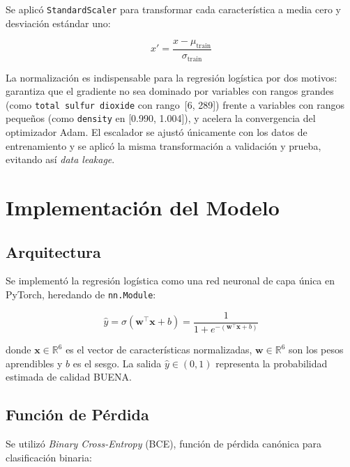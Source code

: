 \documentclass[conference]{IEEEtran}
\begin{document}
Se aplic\'{o} \texttt{StandardScaler} para transformar cada caracter\'{i}stica a media cero y desviaci\'{o}n est\'{a}ndar uno:

\begin{equation}
  x' = \frac{x - \mu_{\text{train}}}{\sigma_{\text{train}}}
\end{equation}

La normalizaci\'{o}n es indispensable para la regresi\'{o}n log\'{i}stica por dos motivos: garantiza que el gradiente no sea dominado por variables con rangos grandes (como \texttt{total sulfur dioxide} con rango~[6, 289]) frente a variables con rangos peque\~{n}os (como \texttt{density} en [0.990, 1.004]), y acelera la convergencia del optimizador Adam. El escalador se ajust\'{o} \'{u}nicamente con los datos de entrenamiento y se aplic\'{o} la misma transformaci\'{o}n a validaci\'{o}n y prueba, evitando as\'{i} \textit{data leakage}.

\section{Implementaci\'{o}n del Modelo}

\subsection{Arquitectura}

Se implement\'{o} la regresi\'{o}n log\'{i}stica como una red neuronal de capa \'{u}nica en PyTorch, heredando de \texttt{nn.Module}:

\begin{equation}
  \hat{y} = \sigma\!\left(\mathbf{w}^\top \mathbf{x} + b\right)
           = \frac{1}{1 + e^{-(\mathbf{w}^\top \mathbf{x} + b)}}
\end{equation}

donde $\mathbf{x} \in \mathbb{R}^6$ es el vector de caracter\'{i}sticas normalizadas, $\mathbf{w} \in \mathbb{R}^6$ son los pesos aprendibles y $b$ es el sesgo. La salida $\hat{y} \in (0,1)$ representa la probabilidad estimada de calidad BUENA.

\subsection{Funci\'{o}n de P\'{e}rdida}

Se utiliz\'{o} \textit{Binary Cross-Entropy} (BCE), funci\'{o}n de p\'{e}rdida can\'{o}nica para clasificaci\'{o}n binaria:
\end{document}
